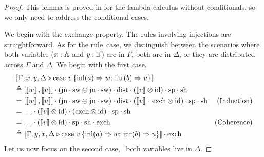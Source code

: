 \begin{proof}
  This lemma is proved in \cite[Lemma 2.2]{dahlqvist2023syntactic} for the lambda calculus without conditionals, so we only need to address the conditional cases.

  We begin with the exchange property. The rules involving injections are
  straightforward. As for the rule~$\text{case}$, we distinguish between
  the scenarios where both variables ($x : \mathbb{A}$ and $y : \mathbb{B}$) are in
  $\Gamma$, both are in $\Delta$, or they are distributed across $\Gamma$ and
  $\Delta$. We begin with the first case. 
  \begin{align*}
    & \sem{\Gamma,x, y, \Delta \vljud \text{case }  v\,  \{\text{inl} (a) \Rightarrow w ;\, \text{inr} (b) \Rightarrow u\}} \\ 
    &\triangleq   [\sem{w}  , \sem{u}] \comp (\text{jn}
    \comp \sw \oplus \text{jn} \comp \sw) \comp \dist 
    \comp (\sem{ v} \otimes \id)  
    \comp \text{sp} 
    \comp \text{sh}
    & \\
    & =  [\sem{w},\sem{u}] \comp (\text{jn}
    \comp \sw \oplus \text{jn} \comp \sw)  \comp \dist 
    \comp (\sem{v} \comp\, \text{exch}
    \otimes \id) \comp \text{sp} 
    \comp \text{sh}
    & \text{(Induction)}\\
    &  =  \dots  \comp (\sem{v} \otimes \id) 
          \comp (\text{exch} \otimes \id) \comp \text{sp} \comp  \text{sh} & \\
    & = \dots \comp (\sem{v} \otimes \id) \comp \text{sp}
          \comp \text{sh}  
          \comp \text{exch} 
    & {\text{(Coherence)}} \\
    & \triangleq \sem{\Gamma,y, x, \Delta \vljud \text{case } v\,  \{\text{inl} (a) \Rightarrow w ;\, \text{inr} (b) \Rightarrow u\}} 
    \comp \text{exch}
  \end{align*}
Let us now focus on the second case, \ie\ both variables live in $\Delta$.


\end{proof}
